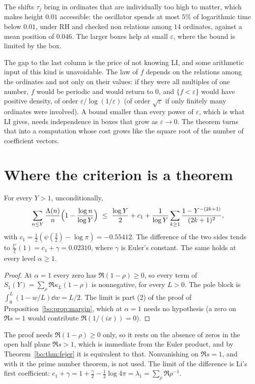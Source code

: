 The shifts $\tau_j$ bring in ordinates that are individually too high to matter, which makes height $0.01$ accessible: the oscillator spends at most $5\%$ of logarithmic time below $0.01$, under RH and checked non relations among $14$ ordinates, against a mean position of $0.046$. The larger boxes help at small $\varepsilon$, where the bound is limited by the box.

The gap to the last column is the price of not knowing LI, and some arithmetic input of this kind is unavoidable. The law of $f$ depends on the relations among the ordinates and not only on their values: if they were all multiples of one number, $f$ would be periodic and would return to $0$, and $\{f<\varepsilon\}$ would have positive density, of order $\varepsilon/\log(1/\varepsilon)$ (of order $\sqrt\varepsilon$ if only finitely many ordinates were involved). A bound smaller than every power of $\varepsilon$, which is what LI gives, needs independence in boxes that grow as $\varepsilon\to0$. The theorem turns that into a computation whose cost grows like the square root of the number of coefficient vectors.

\section{Where the criterion is a theorem}

\begin{corollary}\label{bo:cor:mertens}
For every $Y>1$, unconditionally,
\[
\sum_{n\le Y}\frac{\Lambda(n)}{n}\Bigl(1-\frac{\log n}{\log Y}\Bigr)\ \le\ \frac{\log Y}{2}+c_1+\frac{1}{\log Y}\sum_{k\ge1}\frac{1-Y^{-(2k+1)}}{(2k+1)^2},
\]
with $c_1=\frac12(\psi(\frac32)-\log\pi)=-0.55412$. The difference of the two sides tends to $\frac{\xi'}{\xi}(1)=c_1+\gamma=0.02310$, where $\gamma$ is Euler's constant. The same holds at every level $\alpha\ge1$.
\end{corollary}

\begin{proof}
At $\alpha=1$ every zero has $\Re(1-\rho)\ge0$, so every term of $S_1(Y)=\sum_\rho\Re\kappa_L(1-\rho)$ is nonnegative, for every $L>0$. The pole block is $\int_0^L(1-w/L)\dd w=L/2$. The limit is part (2) of the proof of Proposition~\ref{bo:prop:margin}, which at $\alpha=1$ needs no hypothesis (a zero on $\Re s=1$ would contribute $\Re(1/(ix))=0$).
\end{proof}

The proof needs $\Re(1-\rho)\ge0$ only, so it rests on the absence of zeros in the open half plane $\Re s>1$, which is immediate from the Euler product, and by Theorem~\ref{bo:thm:fejer} it is equivalent to that. Nonvanishing on $\Re s=1$, and with it the prime number theorem, is not used. The limit of the difference is Li's first coefficient: $c_1+\gamma=1+\frac\gamma2-\frac12\log4\pi=\lambda_1=\sum_\rho\Re\rho^{-1}$.

